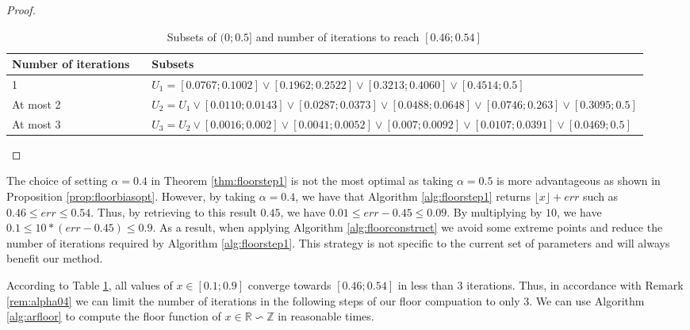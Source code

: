 \documentclass[runningheads]{llncs}
\begin{document}
\begin{proof}
  \begin{table}[!h]
    \caption{Subsets of $(0;\num{0.5}]$ and number of iterations to reach $[\num{0.46};\num{0.54}]$}
    \label{tab:n3}
    \begin{tabularx}{\textwidth}{lcX}
      \toprule
      Number of iterations & &Subsets \\
      \midrule
      1 & &$U_1=[\num{0.0767};\num{0.1002}]\vee[\num{0.1962};\num{0.2522}]\vee[\num{0.3213};\num{0.4060}]\vee [\num{0.4514};\num{0.5}]$\\
      At most 2 & & $U_2=U_1\vee[\num{0.0110};\num{0.0143}]\vee[\num{0.0287};\num{0.0373}]\vee[\num{0.0488};\num{0.0648}]\vee[\num{0.0746};\num{0.263}]\vee[\num{0.3095};\num{0.5}]$\\
      At most 3 & & $U_3=U_2\vee[\num{0.0016};\num{0.002}]\vee[\num{0.0041};\num{0.0052}]\vee[\num{0.007};\num{0.0092}]\vee[\num{0.0107};\num{0.0391}]\vee[\num{0.0469};\num{0.5}]$\\
      \bottomrule
    \end{tabularx}
  \end{table}
\end{proof}

\begin{remark}\label{rem:alpha04}
  The choice of setting $\alpha=\num{0.4}$ in Theorem \ref{thm:floorstep1} is not the most optimal as taking $\alpha=\num{0.5}$ is more advantageous as shown in Proposition \ref{prop:floorbiasopt}. However, by taking $\alpha = \num{0.4}$, we have that Algorithm \ref{alg:floorstep1} returns $\lfloor x \rfloor + err$ such as $\num{0.46}\leq err \leq \num{0.54}$. Thus, by retrieving to this result $0.45$, we have $\num{0.01} \leq err - \num{0.45} \leq \num{0.09}$. By multiplying by $10$, we have $\num{0.1} \leq 10*(err-\num{0.45}) \leq \num{0.9}$. As a result, when applying Algorithm \ref{alg:floorconstruct} we avoid some extreme points and reduce the number of iterations required by Algorithm \ref{alg:floorstep1}. This strategy is not specific to the current set of parameters and will always benefit our method. 
\end{remark}

According to Table \ref{tab:n3}, all values of $x\in[\num{0.1};\num{0.9}]$ converge towards $[\num{0.46};\num{0.54}]$ in less than $3$ iterations. Thus, in accordance with Remark \ref{rem:alpha04} we can limit the number of iterations in the following steps of our floor compuation to only $3$. We can use Algorithm \ref{alg:arfloor} to compute the floor function of $x\in\mathbb{R}\backsim\mathbb{Z}$ in reasonable times.
\end{document}
